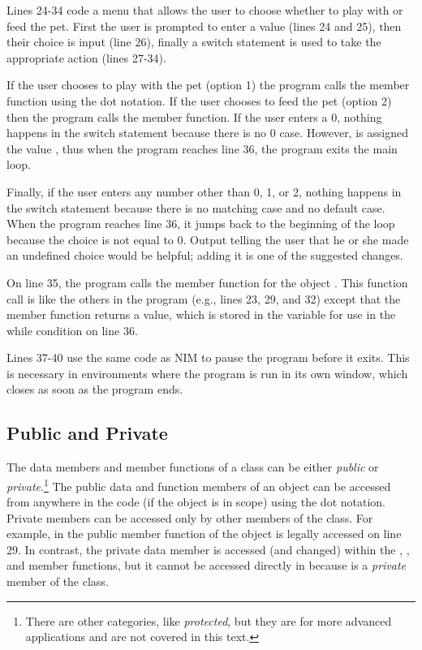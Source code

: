 
Lines 24-34 code a menu that allows the user to choose whether to play with or feed the pet.  First the user is prompted to enter a value (lines 24 and 25), then their choice is input (line 26), finally a switch statement is used to take the appropriate action (lines 27-34).  

If the user chooses to play with the pet (option 1) the program calls the  member function using the dot notation.  If the user chooses to feed the pet (option 2) then the program calls the  member function.  
If the user enters a 0, nothing happens in the switch statement because there is no 0 case.  However,  is assigned the value , thus when the program reaches line 36, the program exits the main loop.

Finally, if the user enters any number other than 0, 1, or 2, nothing happens in the switch statement because there is no matching case and no default case.  When the program reaches line 36, it jumps back to the beginning of the loop because the choice is not equal to 0.  Output telling the user that he or she made an undefined choice would be helpful; adding it is one of the suggested changes.

On line 35, the program calls the  member function for the object .  This function call is like the others in the program (e.g., lines 23, 29, and 32) except that the  member function returns a value, which is stored in the variable  for use in the while condition on line 36.


Lines 37-40 use the same code as NIM to pause the program before it exits.  This is necessary in environments where the program is run in its own window, which closes as soon as the program ends.

\subsection{Public and Private}

The data members and member functions of a class can be either \emph{public} or \emph{private}.\footnote{There are other categories, like \emph{protected}, but they are for more advanced applications and are not covered in this text.} The public data and function members of an object can be accessed from anywhere in the code (if the object is in scope) using the dot notation.  Private members can be accessed only by other members of the class.  For example, in  the public  member function of the  object is legally accessed on line 29.  In contrast, the private  data member is accessed (and changed) within the , , and  member functions, but it cannot be accessed directly in  because  is a \emph{private} member of the  class.
  
